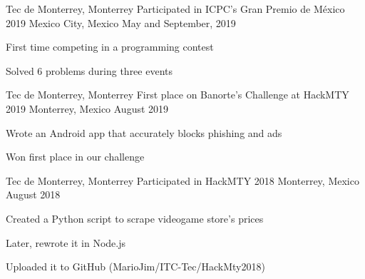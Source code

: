 

\begin{cventries}

  \cventry
    {Tec de Monterrey, Monterrey} %
    {Participated in ICPC's Gran Premio de México 2019} %
    {Mexico City, Mexico} %
    {May and September, 2019} %
    {
      \begin{cvitems} %
        \item {First time competing in a programming contest}
        \item {Solved 6 problems during three events}
      \end{cvitems}
    }

  \cventry
    {Tec de Monterrey, Monterrey} %
    {First place on Banorte's Challenge at HackMTY 2019} %
    {Monterrey, Mexico} %
    {August 2019} %
    {
      \begin{cvitems} %
        \item {Wrote an Android app that accurately blocks phishing and ads}
        \item {Won first place in our challenge}
      \end{cvitems}
    }

  \cventry
    {Tec de Monterrey, Monterrey} %
    {Participated in HackMTY 2018} %
    {Monterrey, Mexico} %
    {August 2018} %
    {
      \begin{cvitems} %
        \item {Created a Python script to scrape videogame store's prices}
        \item {Later, rewrote it in Node.js}
        \item {Uploaded it to GitHub (MarioJim/ITC-Tec/HackMty2018)}
      \end{cvitems}
    }


\end{cventries}

